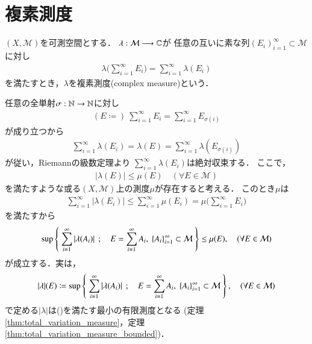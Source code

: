 \section{複素測度}
	\begin{screen}
		\begin{dfn}[複素測度]
			$(X,\mathcal{M})$を可測空間とする．
			$\lambda: \mathcal{M} \longrightarrow \mathbb{C}$が
			任意の互いに素な列$(E_i)_{i=1}^{\infty} \subset \mathcal{M}$に対し
			\begin{align}
				\lambda\biggl( \sum_{i=1}^{\infty} E_i \biggr) = \sum_{i=1}^{\infty} \lambda(E_i)
				\label{eq:dfn_complex_measure}
			\end{align}
			を満たすとき，$\lambda$を複素測度(complex measure)という．
		\end{dfn}
	\end{screen}
	
	任意の全単射$\sigma:\mathbb{N} \rightarrow \mathbb{N}$に対し
	\begin{align}
		(E \coloneqq)\ \sum_{i=1}^{\infty}E_i = \sum_{i=1}^{\infty}E_{\sigma(i)}
	\end{align}
	が成り立つから
	\begin{align}
		\sum_{i=1}^{\infty} \lambda(E_i) = \lambda(E) = \sum_{i=1}^{\infty} \lambda(E_{\sigma(i)})
	\end{align}
	が従い，Riemannの級数定理より
	$\sum_{i=1}^{\infty} \lambda(E_i)$は絶対収束する．
	ここで，
	\begin{align}
		|\lambda(E)| \leq \mu(E) \quad (\forall E \in \mathcal{M})
		\label{radon_nikodym_1}
	\end{align}
	を満たすような或る$(X,\mathcal{M})$上の測度$\mu$が存在すると考える．
	このとき$\mu$は
	\begin{align}
		\sum_{i=1}^{\infty} |\lambda(E_i)| \leq \sum_{i=1}^{\infty} \mu(E_i) 
		= \mu\Biggl(\sum_{i=1}^{\infty} E_i\Biggr)
	\end{align}
	を満たすから
	\begin{align}
		\operatorname*{sup}_{} \left\{\ \sum_{i=1}^{\infty} |\lambda(A_i)|\ \, ; \quad E = \sum_{i=1}^\infty A_i,\ \{A_i\}_{i=1}^\infty \subset \mathcal{M}\ \right\} 
		\leq \mu(E),
		\quad (\forall E \in \mathcal{M})
		\label{radon_nikodym_2}
	\end{align}
	が成立する．実は，
	\begin{align}
		|\lambda|(E) \coloneqq 
		\operatorname*{sup}_{} \left\{\ \sum_{i=1}^{\infty} |\lambda(A_i)|\ \, ; \quad E = \sum_{i=1}^\infty A_i,\ \{A_i\}_{i=1}^\infty \subset \mathcal{M}\ \right\},
		\quad (\forall E \in \mathcal{M})
		\label{radon_nikodym_3}
	\end{align}
	で定める$|\lambda|$は()を満たす最小の有限測度となる
	(定理\ref{thm:total_variation_measure}，定理\ref{thm:total_variation_measure_bounded})．
	
